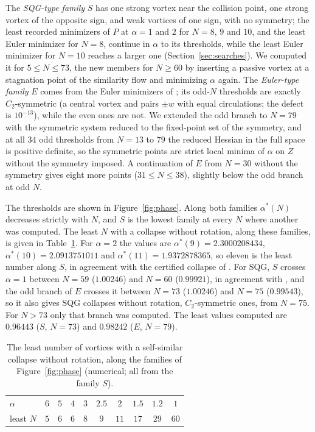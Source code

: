 \documentclass[11pt]{article}
\theoremstyle{definition}
\begin{document}
The \emph{SQG-type family} $S$ has one strong vortex near the collision point, one strong vortex of the opposite sign, and weak vortices of one sign, with no symmetry; the least recorded minimizers of $P$ at $\alpha = 1$ and $2$ for $N = 8$, $9$ and $10$, and the least Euler minimizer for $N = 8$, continue in $\alpha$ to its thresholds, while the least Euler minimizer for $N = 10$ reaches a larger one (Section~\ref{sec:searches}). We computed it for $5 \le N \le 73$, the new members for $N \ge 60$ by inserting a passive vortex at a stagnation point of the similarity flow and minimizing $\alpha$ again. The \emph{Euler-type family} $E$ comes from the Euler minimizers of \cite[Sect.~7]{mw2026}; its odd-$N$ thresholds are exactly $C_2$-symmetric (a central vortex and pairs $\pm w$ with equal circulations; the defect is $10^{-13}$), while the even ones are not. We extended the odd branch to $N = 79$ with the symmetric system reduced to the fixed-point set of the symmetry, and at all $34$ odd thresholds from $N = 13$ to $79$ the reduced Hessian in the full space is positive definite, so the symmetric points are strict local minima of $\alpha$ on $Z$ without the symmetry imposed. A continuation of $E$ from $N = 30$ without the symmetry gives eight more points ($31 \le N \le 38$), slightly below the odd branch at odd $N$.

The thresholds are shown in Figure~\ref{fig:phase}. Along both families $\alpha^*(N)$ decreases strictly with $N$, and $S$ is the lowest family at every $N$ where another was computed. The least $N$ with a collapse without rotation, along these families, is given in Table~\ref{tab:leastN}. For $\alpha = 2$ the values are $\alpha^*(9) = 2.3000208434$, $\alpha^*(10) = 2.0913751011$ and $\alpha^*(11) = 1.9372878365$, so eleven is the least number along $S$, in agreement with the certified collapse of \cite[Theorem~5(a)]{mw2026}. For SQG, $S$ crosses $\alpha = 1$ between $N = 59$ ($1.00246$) and $N = 60$ ($0.99921$), in agreement with \cite[Theorem~5(b)]{mw2026}, and the odd branch of $E$ crosses it between $N = 73$ ($1.00246$) and $N = 75$ ($0.99543$), so it also gives SQG collapses without rotation, $C_2$-symmetric ones, from $N = 75$. For $N > 73$ only that branch was computed. The least values computed are $0.96443$ ($S$, $N = 73$) and $0.98242$ ($E$, $N = 79$).

\begin{table}[t]
\centering
\small
\begin{tabular}{@{}lccccccccc@{}}
\toprule
$\alpha$ & $6$ & $5$ & $4$ & $3$ & $2.5$ & $2$ & $1.5$ & $1.2$ & $1$ \\
least $N$ & $5$ & $6$ & $6$ & $8$ & $9$ & $11$ & $17$ & $29$ & $60$ \\
\bottomrule
\end{tabular}
\caption{The least number of vortices with a self-similar collapse without rotation, along the families of Figure~\ref{fig:phase} (numerical; all from the family $S$).}\label{tab:leastN}
\end{table}
\end{document}
